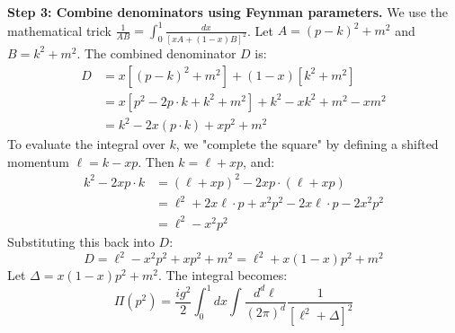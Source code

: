 \begin{solution}
\textbf{Step 3: Combine denominators using Feynman parameters.}
We use the mathematical trick $\frac{1}{AB} = \int_0^1 \frac{dx}{[xA + (1-x)B]^2}$. Let $A = (p-k)^2 + m^2$ and $B = k^2 + m^2$.
The combined denominator $D$ is:
\begin{align*}
    D &= x[(p-k)^2 + m^2] + (1-x)[k^2 + m^2] \\
      &= x[p^2 - 2p \cdot k + k^2 + m^2] + k^2 - xk^2 + m^2 - xm^2 \\
      &= k^2 - 2x(p \cdot k) + xp^2 + m^2
\end{align*}
To evaluate the integral over $k$, we "complete the square" by defining a shifted momentum $\ell = k - xp$.
Then $k = \ell + xp$, and:
\begin{align*}
    k^2 - 2xp \cdot k &= (\ell + xp)^2 - 2xp \cdot (\ell + xp) \\
    &= \ell^2 + 2x\ell \cdot p + x^2p^2 - 2x\ell \cdot p - 2x^2p^2 \\
    &= \ell^2 - x^2p^2
\end{align*}
Substituting this back into $D$:
\begin{equation*}
    D = \ell^2 - x^2p^2 + xp^2 + m^2 = \ell^2 + x(1-x)p^2 + m^2
\end{equation*}
Let $\Delta = x(1-x)p^2 + m^2$. The integral becomes:
\begin{equation*}
    \Pi(p^2) = \frac{i g^2}{2} \int_0^1 dx \int \frac{d^d \ell}{(2\pi)^d} \frac{1}{[\ell^2 + \Delta]^2}
\end{equation*}


\end{solution}
